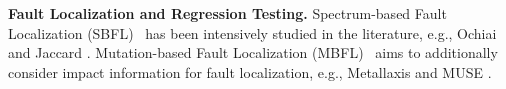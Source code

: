 

\textbf{Fault Localization and Regression Testing.}
Spectrum-based Fault Localization (SBFL)~\cite{zhang2011localizing, abreu2007accuracy, jones2005empirical, abreu2006evaluation, naish2011model, wong2007effective, liblit2005scalable, lucia2014extended, keller2017critical} has been intensively studied in the literature, e.g., Ochiai \cite{abreu2006evaluation} and Jaccard \cite{abreu2007accuracy}. 
Mutation-based Fault Localization (MBFL)~\cite{moon2014ask, zhang2013injecting,budd1981mutation, zhang2010test, musco2017large} aims to additionally consider impact information for fault localization, e.g., Metallaxis \cite{papadakis2012using, papadakis2015metallaxis} and MUSE \cite{moon2014ask}.
%
%
